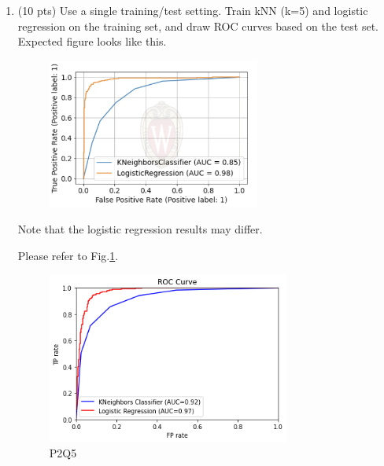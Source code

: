 \documentclass[a4paper]{article}
\theoremstyle{definition}
\newenvironment{soln}{
    \leavevmode\color{blue}\ignorespaces
}{}
\begin{document}
\begin{enumerate}
	\item (10 pts) Use a single training/test setting. Train kNN (k=5) and logistic regression on the training set, and draw ROC curves based on the test set. \\
	Expected figure looks like this.
	\begin{figure}[h]
		\centering
		\includegraphics[width=7cm]{roc.png}
	\end{figure}
	Note that the logistic regression results may differ.
	
	\begin{soln}  Please refer to Fig.\ref{Q5}. \end{soln}

   	\begin{figure}[h]
		\centering
		\includegraphics[width=8cm]{Q5.png}
        \caption{P2Q5}
        \label{Q5}
	\end{figure}
 
\end{enumerate}

\end{document}
